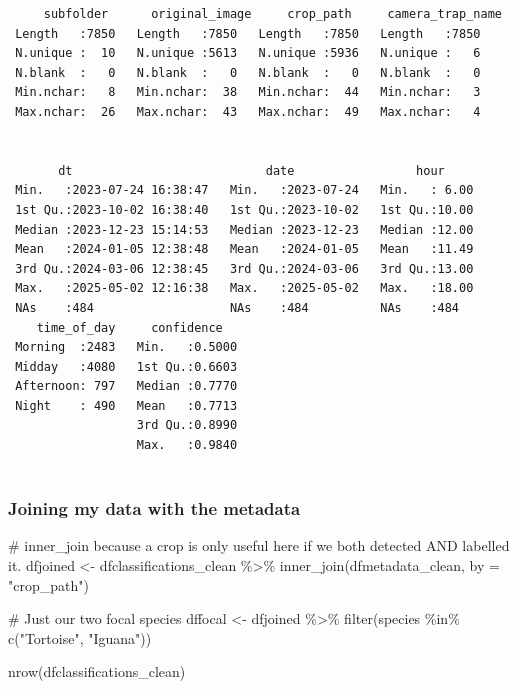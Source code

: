 \documentclass[
  letterpaper,
  DIV=11,
  numbers=noendperiod]{scrartcl}
\newenvironment{Shaded}{\begin{snugshade}}{\end{snugshade}}
\newcommand{\AttributeTok}[1]{\textcolor[rgb]{0.40,0.45,0.13}{#1}}
\newcommand{\CommentTok}[1]{\textcolor[rgb]{0.37,0.37,0.37}{#1}}
\newcommand{\FunctionTok}[1]{\textcolor[rgb]{0.28,0.35,0.67}{#1}}
\newcommand{\NormalTok}[1]{\textcolor[rgb]{0.00,0.23,0.31}{#1}}
\newcommand{\OtherTok}[1]{\textcolor[rgb]{0.00,0.23,0.31}{#1}}
\newcommand{\SpecialCharTok}[1]{\textcolor[rgb]{0.37,0.37,0.37}{#1}}
\newcommand{\StringTok}[1]{\textcolor[rgb]{0.13,0.47,0.30}{#1}}
\begin{document}
\begin{verbatim}
     subfolder      original_image     crop_path     camera_trap_name
 Length   :7850   Length   :7850   Length   :7850   Length   :7850   
 N.unique :  10   N.unique :5613   N.unique :5936   N.unique :   6   
 N.blank  :   0   N.blank  :   0   N.blank  :   0   N.blank  :   0   
 Min.nchar:   8   Min.nchar:  38   Min.nchar:  44   Min.nchar:   3   
 Max.nchar:  26   Max.nchar:  43   Max.nchar:  49   Max.nchar:   4   
                                                                     
                                                                     
       dt                           date                 hour      
 Min.   :2023-07-24 16:38:47   Min.   :2023-07-24   Min.   : 6.00  
 1st Qu.:2023-10-02 16:38:40   1st Qu.:2023-10-02   1st Qu.:10.00  
 Median :2023-12-23 15:14:53   Median :2023-12-23   Median :12.00  
 Mean   :2024-01-05 12:38:48   Mean   :2024-01-05   Mean   :11.49  
 3rd Qu.:2024-03-06 12:38:45   3rd Qu.:2024-03-06   3rd Qu.:13.00  
 Max.   :2025-05-02 12:16:38   Max.   :2025-05-02   Max.   :18.00  
 NAs    :484                   NAs    :484          NAs    :484    
    time_of_day     confidence    
 Morning  :2483   Min.   :0.5000  
 Midday   :4080   1st Qu.:0.6603  
 Afternoon: 797   Median :0.7770  
 Night    : 490   Mean   :0.7713  
                  3rd Qu.:0.8990  
                  Max.   :0.9840  
                                  
\end{verbatim}

\subsubsection{Joining my data with the
metadata}\label{joining-my-data-with-the-metadata}

\begin{Shaded}
\begin{Highlighting}[]
\CommentTok{\# inner\_join because a crop is only useful here if we both detected AND labelled it.}
\NormalTok{dfjoined }\OtherTok{\textless{}{-}}\NormalTok{ dfclassifications\_clean }\SpecialCharTok{\%\textgreater{}\%}
  \FunctionTok{inner\_join}\NormalTok{(dfmetadata\_clean, }\AttributeTok{by =} \StringTok{"crop\_path"}\NormalTok{)}

\CommentTok{\# Just our two focal species}
\NormalTok{dffocal }\OtherTok{\textless{}{-}}\NormalTok{ dfjoined }\SpecialCharTok{\%\textgreater{}\%}
  \FunctionTok{filter}\NormalTok{(species }\SpecialCharTok{\%in\%} \FunctionTok{c}\NormalTok{(}\StringTok{"Tortoise"}\NormalTok{, }\StringTok{"Iguana"}\NormalTok{))}

\FunctionTok{nrow}\NormalTok{(dfclassifications\_clean)}
\end{Highlighting}
\end{Shaded}
\end{document}
